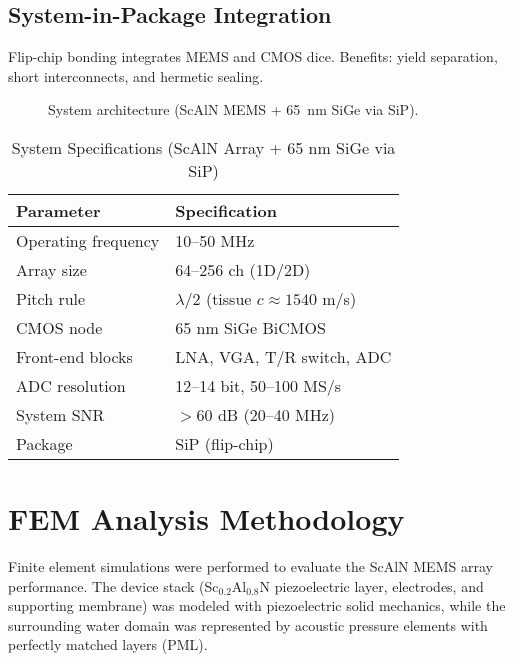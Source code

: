 \documentclass[conference]{IEEEtran}
\begin{document}
\subsection{System-in-Package Integration}
Flip-chip bonding integrates MEMS and CMOS dice. Benefits: yield separation, short interconnects, and hermetic sealing.

\begin{figure}[t]
\centering
{}
\caption{System architecture (ScAlN MEMS + 65~nm SiGe via SiP).}
\label{fig:arch}
\end{figure}

\begin{table}[t]
\caption{System Specifications (ScAlN Array + 65 nm SiGe via SiP)}
\label{tab:spec}
\centering
\begin{tabular}{@{}ll@{}}
\toprule
\textbf{Parameter} & \textbf{Specification}\\
\midrule
Operating frequency & 10--50 MHz\\
Array size & 64--256 ch (1D/2D)\\
Pitch rule & $\lambda/2$ (tissue $c\!\approx\!1540$ m/s)\\
CMOS node & 65 nm SiGe BiCMOS\\
Front-end blocks & LNA, VGA, T/R switch, ADC\\
ADC resolution & 12--14 bit, 50--100 MS/s\\
System SNR & $>60$ dB (20--40 MHz)\\
Package & SiP (flip-chip)\\
\bottomrule
\end{tabular}
\end{table}

\section{FEM Analysis Methodology}
Finite element simulations were performed to evaluate the ScAlN MEMS array performance. The device stack (Sc$_{0.2}$Al$_{0.8}$N piezoelectric layer, electrodes, and supporting membrane) was modeled with piezoelectric solid mechanics, while the surrounding water domain was represented by acoustic pressure elements with perfectly matched layers (PML).
\end{document}
